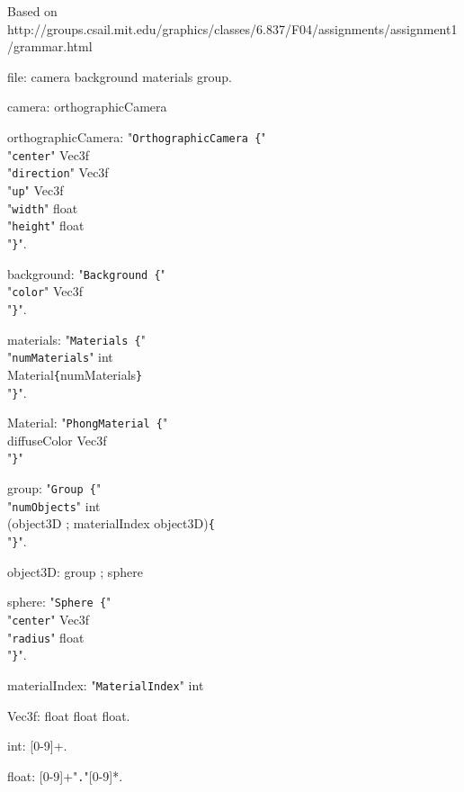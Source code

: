 \documentclass{article}
\begin{document}
Based on\\ \small{http://groups.csail.mit.edu/graphics/classes/6.837/F04/assignments/assignment1/grammar.html}

\begin{grammar}
file: camera background materials group.

camera: orthographicCamera

orthographicCamera: "\verb!OrthographicCamera {!"\\
    "\verb!center!" Vec3f\\
    "\verb!direction!" Vec3f\\
    "\verb!up!" Vec3f\\
    "\verb!width!" float\\
    "\verb!height!" float\\
"\verb!}!".

background: "\verb!Background {!"\\
    "\verb!color!" Vec3f\\
"\verb!}!".

materials: "\verb!Materials {!"\\
    "\verb!numMaterials!" int\\
    Material\verb!{!numMaterials\verb!}!\\
"\verb!}!".

Material: "\verb!PhongMaterial {!"\\
    diffuseColor Vec3f\\
"\verb!}!"

group: "\verb!Group {!"\\
    "\verb!numObjects!" int\\
    (object3D ; materialIndex object3D)\verb!{!\\
"\verb!}!".

object3D: group ; sphere

sphere: "\verb!Sphere {!"\\
    "\verb!center!" Vec3f\\
    "\verb!radius!" float\\
"\verb!}!".

materialIndex: "\verb!MaterialIndex!" int

Vec3f: float float float.

int: [0-9]+.

float: [0-9]+"\verb!.!"[0-9]*.

\end{grammar}
\end{document}
